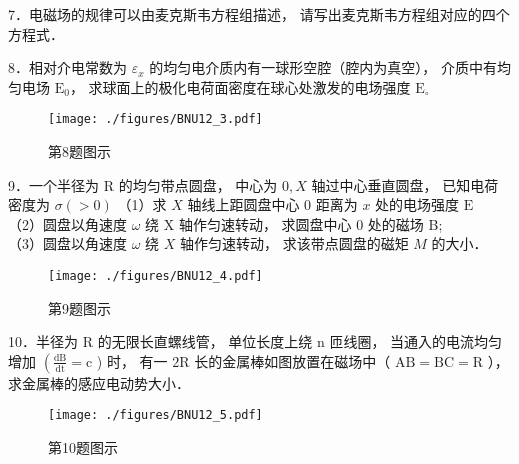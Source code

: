 7．电磁场的规律可以由麦克斯韦方程组描述， 请写出麦克斯韦方程组对应的四个方程式．

8．相对介电常数为 $\varepsilon_{x}$ 的均匀电介质内有一球形空腔（腔内为真空）， 介质中有均匀电场 $\mathrm{E}_{0}$， 求球面上的极化电荷面密度在球心处激发的电场强度 $\mathrm{E}_{\circ}$
\begin{figure}[ht]
\centering
\texttt{[image: ./figures/BNU12\_3.pdf]}
\caption{第8题图示} \label{BNU12_fig3}
\end{figure}

9．一个半径为 $\mathrm{R}$ 的均匀带点圆盘， 中心为 $0, X$ 轴过中心垂直圆盘， 已知电荷密度为 $\sigma(>0)$
（1）求 $X$ 轴线上距圆盘中心 0 距离为 $x$ 处的电场强度 $\mathrm{E} $\\
（2）圆盘以角速度 $\omega$ 绕 $\mathrm{X}$ 轴作匀速转动， 求圆盘中心 0 处的磁场 B;\\
（3）圆盘以角速度 $\omega$ 绕 $X$ 轴作匀速转动， 求该带点圆盘的磁矩 $M$ 的大小．
\begin{figure}[ht]
\centering
\texttt{[image: ./figures/BNU12\_4.pdf]}
\caption{第9题图示} \label{BNU12_fig4}
\end{figure}

10．半径为 $\mathrm{R}$ 的无限长直螺线管， 单位长度上绕 $\mathrm{n}$ 匝线圈， 当通入的电流均匀
增加 $\left(\frac{\mathrm{dB}}{\mathrm{dt}}=\mathrm{c}\right.$ ) 时， 有一 $2 \mathrm{R}$ 长的金属棒如图放置在磁场中（ $\mathrm{AB}=\mathrm{BC}=\mathrm{R}$ ）， 求金属棒的感应电动势大小．
\begin{figure}[ht]
\centering
\texttt{[image: ./figures/BNU12\_5.pdf]}
\caption{第10题图示} \label{BNU12_fig5}
\end{figure}